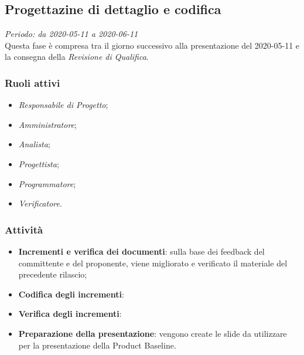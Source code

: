\subsection{Progettazine di dettaglio e codifica}
\textit{Periodo: da 2020-05-11 a 2020-06-11}\\
Questa fase è compresa tra il giorno successivo alla presentazione del 2020-05-11 e la consegna della \textit{Revisione di Qualifica}.

\subsubsection{Ruoli attivi} \begin{itemize}
\item \textit{Responsabile di Progetto};
\item \textit{Amministratore};
\item \textit{Analista};
\item \textit{Progettista};
\item \textit{Programmatore};
\item \textit{Verificatore}.
\end{itemize}

\subsubsection{Attività}
\begin{itemize}
\item \textbf{Incrementi e verifica dei documenti}: sulla base dei feedback del committente e del proponente, viene migliorato e verificato il materiale del precedente rilascio;
\item \textbf{Codifica degli incrementi}: 
\item \textbf{Verifica degli incrementi}: 
\item \textbf{Preparazione della presentazione}: vengono create le slide da utilizzare per la presentazione della Product Baseline.
\end{itemize}

